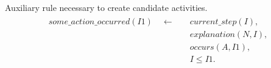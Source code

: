 \documentclass[11pt, oneside]{article}
\begin{document}

Auxiliary rule necessary to create candidate activities.
\begin{align}\begin{split}
some\_action\_occurred(I1) \quad \leftarrow \quad &current\_step(I),\\
&explanation(N,I),\\
&occurs(A,I1),\\
&I\leq I1.
\end{split}\end{align}
\end{document}
